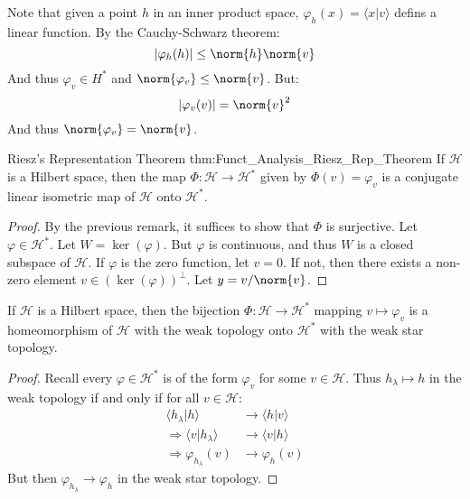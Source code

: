     Note that given a point $h$ in an inner product space,
    $\varphi_{h}(x)=\langle{x|v}\rangle$ defins a linear
    function. By the Cauchy-Schwarz theorem:
    \begin{equation}
        |\varphi_{h}(h)|\leq\norm{h}\norm{v}
    \end{equation}
    And thus $\varphi_{v}\in{H}^{*}$ and
    $\norm{\varphi_{v}}\leq\norm{v}$. But:
    \begin{equation}
        |\varphi_{v}(v)|=\norm{v}^{2}
    \end{equation}
    And thus $\norm{\varphi_{v}}=\norm{v}$.
    \begin{ltheorem}{Riesz's Representation Theorem}
          {thm:Funct_Analysis_Riesz_Rep_Theorem}
        If $\mathcal{H}$ is a Hilbert space, then the
        map $\Phi:\mathcal{H}\rightarrow\mathcal{H}^{*}$
        given by $\Phi(v)=\varphi_{v}$ is a conjugate
        linear isometric map of $\mathcal{H}$ onto
        $\mathcal{H}^{*}$.
    \end{ltheorem}
    \begin{proof}
        By the previous remark, it suffices to show that
        $\Phi$ is surjective. Let $\varphi\in\mathcal{H}^{*}$.
        Let $W=\ker(\varphi)$. But $\varphi$ is continuous,
        and thus $W$ is a closed subspace of $\mathcal{H}$.
        If $\varphi$ is the zero function, let $v=0$. If not,
        then there exists a non-zero element
        $v\in(\ker(\varphi))^{\perp}$. Let
        $y=v/\norm{v}$.
    \end{proof}
    \begin{theorem}
        If $\mathcal{H}$ is a Hilbert space, then the
        bijection $\Phi:\mathcal{H}\rightarrow\mathcal{H}^{*}$
        mapping $v\mapsto\varphi_{v}$ is a homeomorphism
        of $\mathcal{H}$ with the weak topology onto
        $\mathcal{H}^{*}$ with the weak star topology.
    \end{theorem}
    \begin{proof}
        Recall every $\varphi\in\mathcal{H}^{*}$ is of the
        form $\varphi_{v}$ for some $v\in\mathcal{H}$.
        Thus $h_{\lambda}\mapsto{h}$ in the weak topology
        if and only if for all $v\in\mathcal{H}$:
        \begin{subequations}
            \begin{align}
                \langle{h_{\lambda}|h}\rangle
                &\rightarrow\langle{h|v}\rangle\\
                \Longrightarrow
                \langle{v|h_{\lambda}}\rangle
                &\rightarrow\langle{v|h}\rangle\\
                \Longrightarrow\varphi_{h_{\lambda}}(v)
                &\rightarrow\varphi_{h}(v)
            \end{align}
        \end{subequations}
        But then $\varphi_{h_{\lambda}}\rightarrow\varphi_{h}$
        in the weak star topology.
    \end{proof}
